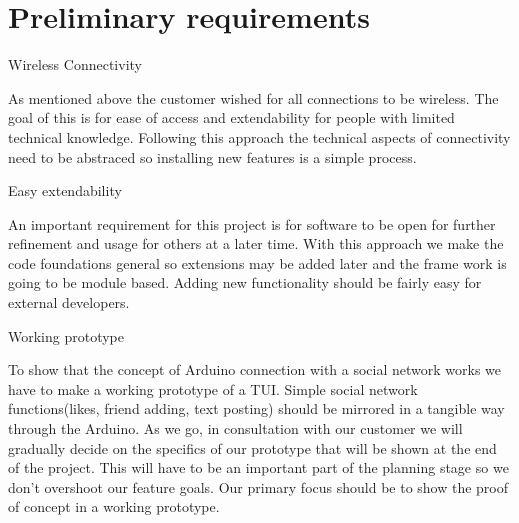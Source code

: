 \section{Preliminary requirements}


Wireless Connectivity

As mentioned above the customer wished for all connections to be wireless. The goal of this is for ease of access and extendability for people with limited technical knowledge. Following this approach the technical aspects of connectivity need to be abstraced so installing new features is a simple process.

Easy extendability

An important requirement for this project is for software to be open for further refinement and usage for others at a later time. With this approach we make the code foundations general so extensions may be added later and the frame work is going to be module based. Adding new functionality should be fairly easy for external developers.

Working prototype

To show that the concept of Arduino connection with a social network works we have to make a working prototype of a TUI. Simple social network functions(likes, friend adding, text posting) should be mirrored in a tangible way through the Arduino. As we go, in consultation with our customer we will gradually decide on the specifics of our prototype that will be shown at the end of the project. This will have to be an important part of the planning stage so we don’t overshoot our feature goals. Our primary focus should be to show the proof of concept in a working prototype.